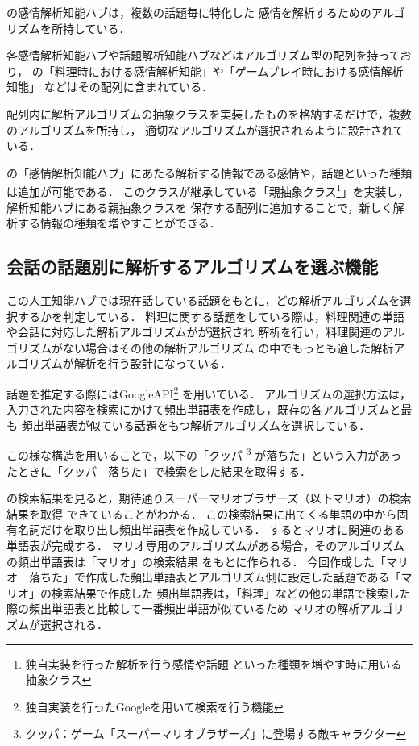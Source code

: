 
の感情解析知能ハブは，複数の話題毎に特化した
感情を解析するためのアルゴリズムを所持している．

各感情解析知能ハブや話題解析知能ハブなどはアルゴリズム型の配列を持っており，
の「料理時における感情解析知能」や「ゲームプレイ時における感情解析知能」
などはその配列に含まれている．

配列内に解析アルゴリズムの抽象クラスを実装したものを格納するだけで，複数のアルゴリズムを所持し，
適切なアルゴリズムが選択されるように設計されている．

の「感情解析知能ハブ」にあたる解析する情報である感情や，話題といった種類
は追加が可能である．
このクラスが継承している「親抽象クラス\footnote{独自実装を行った解析を行う感情や話題
といった種類を増やす時に用いる抽象クラス}」を実装し，解析知能ハブにある親抽象クラスを
保存する配列に追加することで，新しく解析する情報の種類を増やすことができる．

\subsection{会話の話題別に解析するアルゴリズムを選ぶ機能}
この人工知能ハブでは現在話している話題をもとに，どの解析アルゴリズムを選択するかを判定している．
料理に関する話題をしている際は，料理関連の単語や会話に対応した解析アルゴリズムがが選択され
解析を行い，料理関連のアルゴリズムがない場合はその他の解析アルゴリズム
の中でもっとも適した解析アルゴリズムが解析を行う設計になっている．

話題を推定する際にはGoogleAPI\footnote{独自実装を行ったGoogleを用いて検索を行う機能}
を用いている．
アルゴリズムの選択方法は，入力された内容を検索にかけて頻出単語表を作成し，既存の各アルゴリズムと最も
頻出単語表が似ている話題をもつ解析アルゴリズムを選択している．

この様な構造を用いることで，以下の「クッパ
	\footnote{クッパ：ゲーム「スーパーマリオブラザーズ」に登場する敵キャラクター}
が落ちた」という入力があったときに「クッパ　落ちた」で検索をした結果を取得する．


の検索結果を見ると，期待通りスーパーマリオブラザーズ（以下マリオ）の検索結果を取得
できていることがわかる．
この検索結果に出てくる単語の中から固有名詞だけを取り出し頻出単語表を作成している．
するとマリオに関連のある単語表が完成する．
マリオ専用のアルゴリズムがある場合，そのアルゴリズムの頻出単語表は「マリオ」の検索結果
をもとに作られる．
今回作成した「マリオ　落ちた」で作成した頻出単語表とアルゴリズム側に設定した話題である「マリオ」の検索結果で作成した
頻出単語表は，「料理」などの他の単語で検索した際の頻出単語表と比較して一番頻出単語が似ているため
マリオの解析アルゴリズムが選択される．


